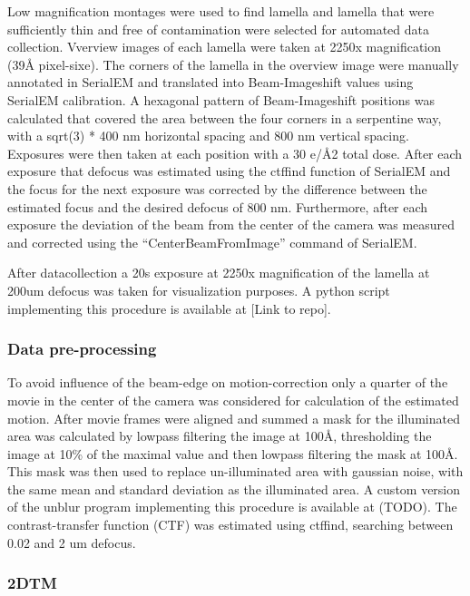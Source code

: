\documentclass[
]{article}
\begin{document}
Low magnification montages were used to find lamella and lamella that were
sufficiently thin and free of contamination were selected for automated data
collection. Vverview images of each lamella were taken at 2250x magnification
(39Å pixel-sixe). The corners of the lamella in the overview image were manually
annotated in SerialEM and translated into Beam-Imageshift values using SerialEM
calibration. A hexagonal pattern of Beam-Imageshift positions was calculated
that covered the area between the four corners in a serpentine way, with a
sqrt(3) * 400 nm horizontal spacing and 800 nm vertical spacing. Exposures were
then taken at each position with a 30 e/Å2 total dose. After each exposure that
defocus was estimated using the ctffind function of SerialEM and the focus for
the next exposure was corrected by the difference between the estimated focus
and the desired defocus of 800 nm. Furthermore, after each exposure the
deviation of the beam from the center of the camera was measured and corrected
using the ``CenterBeamFromImage'' command of SerialEM.

After datacollection a 20s exposure at 2250x magnification of the lamella at
200um defocus was taken for visualization purposes. A python script implementing
this procedure is available at {[}Link to repo{]}.

\hypertarget{data-pre-processing}{%
\subsubsection{Data pre-processing}\label{data-pre-processing}}

To avoid influence of the beam-edge on motion-correction only a quarter
of the movie in the center of the camera was considered for calculation of the
estimated motion. After movie frames were aligned and summed a mask for the
illuminated area was calculated by lowpass filtering the image at 100Å,
thresholding the image at 10\% of the maximal value and then lowpass filtering
the mask at 100Å. This mask was then used to replace un-illuminated area with
gaussian noise, with the same mean and standard deviation as the illuminated
area. A custom version of the unblur program implementing this procedure is
available at (TODO).
The contrast-transfer function (CTF) was estimated using ctffind, searching
between 0.02 and 2 um defocus.

\hypertarget{dtm}{%
\subsubsection{2DTM}\label{dtm}}
\end{document}
